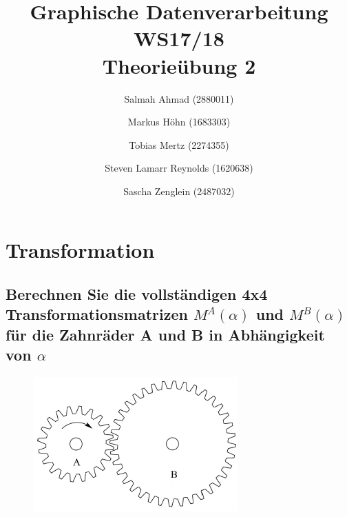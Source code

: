 \documentclass[a4paper,10pt,DIV=14]{scrartcl}
\begin{document}
\title{Graphische Datenverarbeitung WS17/18 \\ Theorieübung 2}
\author{
  Salmah Ahmad (2880011)
  \and
  Markus Höhn (1683303)
  \and
  Tobias Mertz (2274355)
  \and
  Steven Lamarr Reynolds (1620638)
  \and
  Sascha Zenglein (2487032)
}

\maketitle

\section{Transformation}

\subsection{Berechnen Sie die vollständigen 4x4 Transformationsmatrizen $M^A(\alpha)$ und $M^B(\alpha)$ für die Zahnräder A und B in Abhängigkeit von $\alpha$}

\begin{figure}[!htbp]
	\centering
	\includegraphics[]{gear}
\end{figure}
\end{document}
